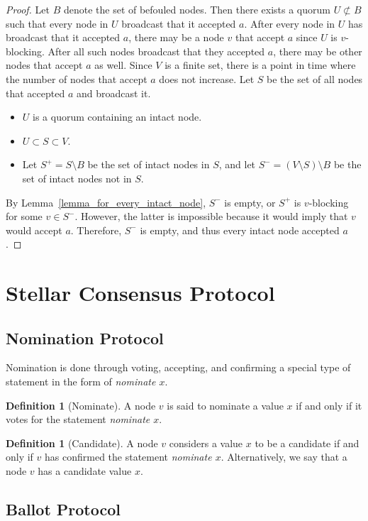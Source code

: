 \documentclass[12pt, psamsfonts]{amsart}
\theoremstyle{definition}
\newtheorem{defn}[thm]{Definition}
\theoremstyle{remark}
\numberwithin{equation}{subsection}
\begin{document}
\begin{proof}
    Let $B$ denote the set of befouled nodes.
    Then there exists a quorum $U \not\subset B$ such that every node in $U$ broadcast that it accepted $a$.
    After every node in $U$ has broadcast that it accepted $a$, there may be a node $v$ that accept $a$ since $U$ is $v$-blocking.
    After all such nodes broadcast that they accepted $a$, there may be other nodes that accept $a$ as well.
    Since $V$ is a finite set, there is a point in time where the number of nodes that accept $a$ does not increase.
    Let $S$ be the set of all nodes that accepted $a$ and broadcast it.
    \begin{itemize}
        \item
            $U$ is a quorum containing an intact node.
        \item
            $U \subset S \subset V$.
        \item
            Let $S^{+} = S \setminus B$ be the set of intact nodes in $S$, and let $S^{-} = (V \setminus S) \setminus B$ be the set of intact nodes not in $S$.
    \end{itemize}
    By Lemma~\ref{lemma_for_every_intact_node}, $S^{-}$ is empty, or $S^{+}$ is $v$-blocking for some $v \in S^{-}$.
    However, the latter is impossible because it would imply that $v$ would accept $a$.
    Therefore, $S^{-}$ is empty, and thus every intact node accepted $a$.
\end{proof}

\section{Stellar Consensus Protocol}
\subsection{Nomination Protocol}

Nomination is done through voting, accepting, and confirming a special type of statement in the form of \textit{nominate $x$}.

\begin{defn}[Nominate]
    A node $v$ is said to nominate a value $x$ if and only if it votes for the statement \textit{nominate $x$}.
\end{defn}

\begin{defn}[Candidate]
    A node $v$ considers a value $x$ to be a candidate if and only if $v$ has confirmed the statement \textit{nominate $x$}.
    Alternatively, we say that a node $v$ has a candidate value $x$.
\end{defn}

\subsection{Ballot Protocol}
\end{document}
